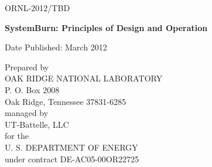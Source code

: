 \documentclass[11pt]{article}
\begin{document}
\newpage

\begin{titlepage}

\begin{flushright}ORNL-2012/TBD
\end{flushright}

\vspace{1.25in}

\begin{center}
{\bf{
SystemBurn: Principles of Design and Operation
}}
\vspace{0.5in}

\author{\\
Jeffery A. Kuehn, Stephen W. Poole, Stephen W. Hodson, \\
Joshua K. Lothian, Jonathan D. Dobson, David B. Reister, \\
Nicholas R. Lewkow, S. Ross Glandon,  Jacob T. Peek \\
\\
The Extreme Scale Systems Center \\
Computer Science and Mathematics Division \\
Oak Ridge National Laboratory \\
Oak Ridge, TN 37831 \\
http://www.csm.ornl.gov/essc\\
\\
\\
kuehn@ornl.gov, spoole@ornl.gov, hodsonsw@ornl.gov,\\
lothian@ornl.gov, dobsonjd@ornl.gov, dbr@ornl.gov, \\
lewkownr@ornl.gov, glandonsr@ornl.gov, peekjt@ornl.gov\\
}


\vspace{1in}

Date Published: March 2012

\vspace{1in}

Prepared by \\
OAK RIDGE NATIONAL LABORATORY \\
P. O. Box 2008 \\
Oak Ridge, Tennessee 37831-6285 \\
managed by \\
UT-Battelle, LLC \\
for the \\
U. S. DEPARTMENT OF ENERGY \\
under contract DE-AC05-00OR22725

\end{center}

\end{titlepage}
\end{document}
